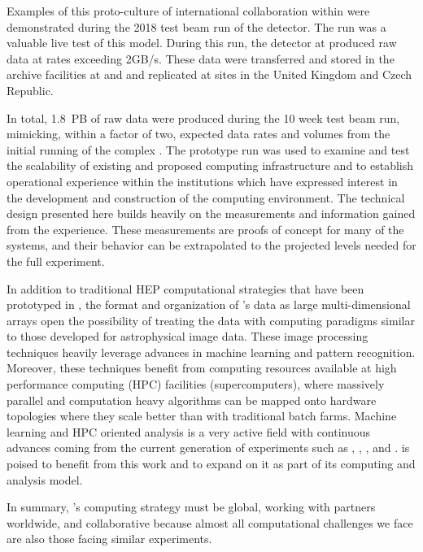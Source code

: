 Examples of this proto-culture of international collaboration within  were demonstrated during the 2018 test beam run of the  detector.  The  run was a valuable live test of this model.  During this run, the  detector at  produced raw data at rates exceeding 2GB/s.  These data were transferred and stored in the archive facilities at  and  and replicated at sites in the United Kingdom and Czech Republic.

In total, \SI{1.8}{PB} of raw data were produced during the 10 week test beam run, mimicking, within a factor of two, expected data rates and volumes from the initial running of the  complex .  The prototype run was used to examine and test the scalability of existing and proposed computing infrastructure and to establish operational experience within the institutions which have expressed interest in the development and construction of the  computing environment.  The technical design presented here builds heavily on the measurements and information gained from the  experience.   These measurements are proofs of concept for many of the systems, and their behavior can be extrapolated to the projected levels needed for the full  experiment. 

In addition to traditional HEP computational strategies that have been prototyped in , the format and organization of 's data as large multi-dimensional arrays open the possibility of treating the data with computing paradigms similar to those developed for astrophysical image data.  These image processing techniques heavily leverage advances in machine learning and pattern recognition.  Moreover, these techniques benefit from computing resources available at high performance computing (HPC) facilities (supercomputers), where massively parallel and computation heavy algorithms can be mapped onto hardware topologies where they scale better than with traditional batch farms.  Machine learning and HPC oriented analysis is a very active field with continuous advances coming from the current generation of  experiments such as , , , and .   is poised to benefit from this work and to expand on it as part of its computing and analysis model.

In summary, 's computing strategy must be global, working with partners worldwide, and collaborative because almost all computational challenges we face are also those facing similar experiments. 
 
